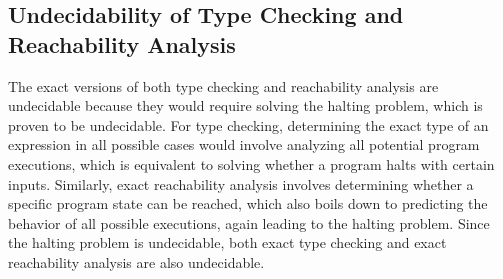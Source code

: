 \subsection{Undecidability of Type Checking and Reachability Analysis}
The exact versions of both type checking and reachability analysis are undecidable because they would require solving the halting problem, which is proven to be undecidable. For type checking, determining the exact type of an expression in all possible cases would involve analyzing all potential program executions, which is equivalent to solving whether a program halts with certain inputs. Similarly, exact reachability analysis involves determining whether a specific program state can be reached, which also boils down to predicting the behavior of all possible executions, again leading to the halting problem. Since the halting problem is undecidable, both exact type checking and exact reachability analysis are also undecidable.
